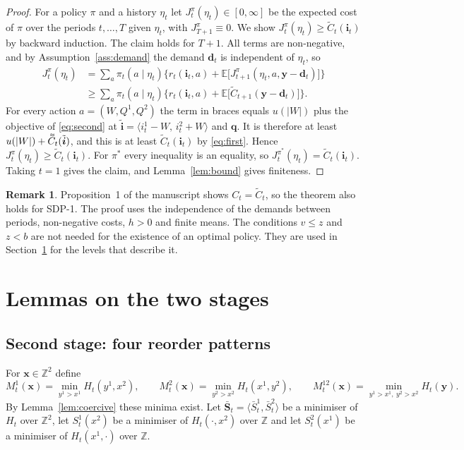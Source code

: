 \documentclass[11pt]{article}
\DeclareRobustCommand{\dbtilde}[1]{\accentset{\approx}{#1}}
\renewcommand{\vec}[1]{\boldsymbol{#1}}
\newcommand{\E}{\mathbb{E}}
\newcommand{\Z}{\mathbb{Z}}
\newcommand{\Ct}{\widetilde{C}}
\newcommand{\Cq}{\dbtilde{C}}
\theoremstyle{definition}
\newtheorem{remark}{Remark}
\begin{document}
\begin{proof}
For a policy $\pi$ and a history $\eta_t$ let $J^\pi_t(\eta_t)\in[0,\infty]$ be the expected cost of $\pi$ over the periods $t,\ldots,T$ given $\eta_t$, with $J^\pi_{T+1}\equiv0$. We show $J^\pi_t(\eta_t)\ge\Ct_t(\vec{i}_t)$ by backward induction. The claim holds for $T+1$. All terms are non-negative, and by Assumption~\ref{ass:demand} the demand $\vec{d}_t$ is independent of $\eta_t$, so
\begin{align*}
J^\pi_t(\eta_t)&=\sum_{a}\pi_t(a\mid\eta_t)\Big\{r_t(\vec{i}_t,a)+\E\big[J^\pi_{t+1}(\eta_t,a,\vec{y}-\vec{d}_t)\big]\Big\}\\
&\ge\sum_{a}\pi_t(a\mid\eta_t)\Big\{r_t(\vec{i}_t,a)+\E\big[\Ct_{t+1}(\vec{y}-\vec{d}_t)\big]\Big\}.
\end{align*}
For every action $a=(W,Q^1,Q^2)$ the term in braces equals $u(|W|)$ plus the objective of \eqref{eq:second} at $\tilde{\vec{i}}=\langle i^1_t-W,\,i^2_t+W\rangle$ and $\vec{q}$. It is therefore at least $u(|W|)+\Cq_t(\tilde{\vec{i}})$, and this is at least $\Ct_t(\vec{i}_t)$ by \eqref{eq:first}. Hence $J^\pi_t(\eta_t)\ge\Ct_t(\vec{i}_t)$. For $\pi^*$ every inequality is an equality, so $J^{\pi^*}_t(\eta_t)=\Ct_t(\vec{i}_t)$. Taking $t=1$ gives the claim, and Lemma~\ref{lem:bound} gives finiteness.
\end{proof}

\begin{remark}
Proposition~1 of the manuscript shows $C_t=\Ct_t$, so the theorem also holds for SDP-1. The proof uses the independence of the demands between periods, non-negative costs, $h>0$ and finite means. The conditions $v\le z$ and $z<b$ are not needed for the existence of an optimal policy. They are used in Section~\ref{sec:lemmas} for the levels that describe it.
\end{remark}

\section{Lemmas on the two stages}\label{sec:lemmas}

\subsection{Second stage: four reorder patterns}

For $\vec{x}\in\Z^2$ define
\[
M^1_t(\vec{x})=\min_{y^1>x^1}H_t(y^1,x^2),\qquad M^2_t(\vec{x})=\min_{y^2>x^2}H_t(x^1,y^2),\qquad M^{12}_t(\vec{x})=\min_{y^1>x^1,\ y^2>x^2}H_t(\vec{y}).
\]
By Lemma~\ref{lem:coercive} these minima exist. Let $\bar{\vec{S}}_t=\langle\bar S^1_t,\bar S^2_t\rangle$ be a minimiser of $H_t$ over $\Z^2$, let $S^1_t(x^2)$ be a minimiser of $H_t(\cdot,x^2)$ over $\Z$ and let $S^2_t(x^1)$ be a minimiser of $H_t(x^1,\cdot)$ over $\Z$.
\end{document}
